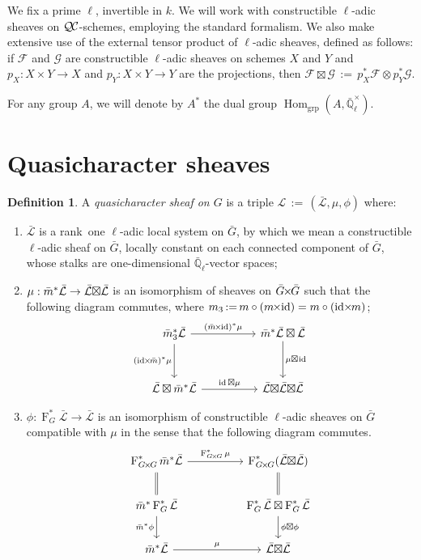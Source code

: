\documentclass{amsart}
\makeatletter
\theoremstyle{plain}
\theoremstyle{definition}
\newtheorem{definition}[theorem]{Definition}
\theoremstyle{remark}
\newcommand{\EE}{\mathbb{\bar Q}_\ell}
\newcommand{\Fq}{k}
\newcommand{\EEx}{\EE^\times}
\newcommand{\Frob}[1]{\operatorname{F}_{#1}}
\DeclareMathOperator{\Hom}{Hom}
\DeclareMathOperator{\id}{id}
\newcommand{\ceq}{{\, :=\, }}
\newcommand{\qcs}[1]{{\mathcal{#1}}}
\newcommand{\gqcs}[1]{{\mathcal{\bar #1}}}
\newcommand{\QC}{{\mathcal{Q\hskip-0.8pt C}}}
\newcommand{\labitem}[2]{
\def\@itemlabel{\textbf{#1}}
\item
\def\@currentlabel{#1}\label{#2}}
\newcommand{\bm}{\bar{m}}
\newcommand{\bG}{\bar{G}}
\newcommand{\tight}[3]{\hspace{-#1pt}{#2}\hspace{-#3pt}}
\newcommand{\bGxG}{\text{$\bar{G} \tight{1}{\times}{1} \bar{G}$}}
\newcommand{\GxxG}{\text{$G \tight{1}{\times}{1} G$}}
\newcommand{\LxL}{\text{$\gqcs{L} \tight{0}{\boxtimes}{0} \gqcs{L}$}}
\makeatother
\begin{document}
We fix a prime $\ell$, invertible in $\Fq$.
We will work with constructible $\ell$-adic sheaves 
on $\QC$-schemes, employing the standard formalism.
We also make extensive use of the external tensor product of $\ell$-adic sheaves,
defined as follows: if $\mathcal{F}$ and $\mathcal{G}$ are constructible $\ell$-adic
sheaves on schemes $X$ and $Y$ and $p_X : X\times Y\to X$ and $p_Y : X\times Y \to Y$
are the projections, then $\mathcal{F}\boxtimes \mathcal{G} \ceq p_X^* \mathcal{F} \otimes p_Y^*\mathcal{G}$.

For any group $A$, we will denote by $A^*$ the dual group $\Hom_\text{grp}(A, \EEx)$.

\section{Quasicharacter sheaves}\label{sec:category}

\begin{definition}\label{def:QC}
A \emph{quasicharacter sheaf on $G$} is a triple
$\qcs{L}\ceq (\gqcs{L},\mu,\phi)$ where:
\begin{enumerate}
\labitem{(QC.1)}{QC.1} $\gqcs{L}$ is a rank~one $\ell$-adic local system on $\bG$, by which we mean
a constructible $\ell$-adic sheaf on $\bG$, locally constant on each connected
component of $\bG$, whose stalks are one-dimensional $\EE$-vector spaces; 
\labitem{(QC.2)}{QC.2} $\mu: \bm^* \gqcs{L} \to \LxL$ is an isomorphism of
sheaves on $\bGxG$ such that the following diagram commutes, 
  where $m_3 \ceq m\circ (m\tight{1}{\times}{2}\id) = m\circ (\id\tight{2}{\times}{1} m)$;
  \[
  \begin{tikzcd}[row sep=30]
  \bm_3^*\gqcs{L} \arrow{rr}{(\bm \tight{1}{\times}{2} \id)^*\mu} \arrow[swap]{d}{(\id \tight{2}{\times}{1} \bm)^*\mu}
    &&  \bm^*\gqcs{L} \boxtimes \gqcs{L} \dar{\mu \tight{0}{\boxtimes}{1} \id} \\
    \gqcs{L} \boxtimes \bm^* \gqcs{L} \arrow{rr}{\id \boxtimes \mu}
    &&  \gqcs{L} \tight{0}{\boxtimes}{0} \LxL
  \end{tikzcd}
  \]
\labitem{(QC.3)}{QC.3} $\phi : \Frob{G}^* \gqcs{L} \to \gqcs{L}$ is an
  isomorphism of constructible $\ell$-adic sheaves on $\bG$ compatible with
  $\mu$ in the sense that the following diagram commutes.
  \[
  \begin{tikzcd}[row sep=20]
  \Frob{\GxxG}^* \bm^* \gqcs{L} \arrow{rr}{\Frob{\GxxG}^*\mu}
    && \Frob{\GxxG}^*(\LxL)\\
    \arrow[equal]{u} \bm^*  \Frob{G}^* \gqcs{L} \arrow[swap]{d}{\bm^* \phi}
    && \Frob{G}^*\gqcs{L}\boxtimes \Frob{G}^*\gqcs{L} \dar{\phi\boxtimes \phi} \arrow[equal]{u} \\
    \bm^*\gqcs{L} \arrow{rr}{\mu}
    && \LxL
  \end{tikzcd}
  \]
\end{enumerate}
\end{definition}
\end{document}
